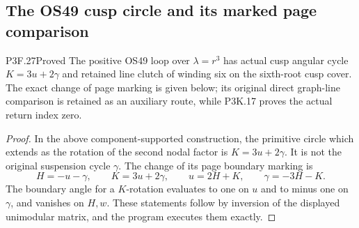 \subsection{The OS49 cusp circle and its marked page comparison}
\begin{statement}{P3F.27}{Proved}
The positive OS49 loop over $\lambda=r^3$ has actual cusp angular cycle $K=3u+2\gamma$ and retained line clutch of winding six on the sixth-root cusp cover. The exact change of page marking is given below; its original direct graph-line comparison is retained as an auxiliary route, while P3K.17 proves the actual return index zero.
\end{statement}
\begin{proof}
In the above component-supported construction, the primitive circle which extends as the rotation of the second nodal factor is \(K=3u+2\gamma\). It is not the original suspension cycle \(\gamma\). The change of its page boundary marking is \[
 H=-u-\gamma,\qquad K=3u+2\gamma,
 \qquad u=2H+K,\qquad\gamma=-3H-K.               \tag{P3F.27.1}
\] The boundary angle for a \(K\)-rotation evaluates to one on \(u\) and to minus one on \(\gamma\), and vanishes on \(H,w\). These statements follow by inversion of the displayed unimodular matrix, and the program executes them exactly.


\end{proof}
